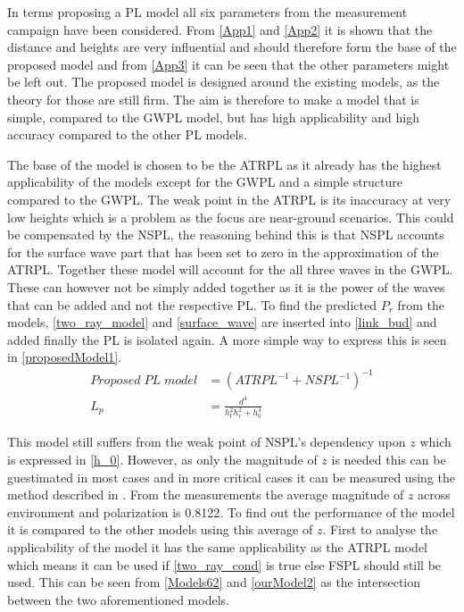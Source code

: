 

In terms proposing a PL model all six parameters from the measurement campaign have been considered. From \autoref{App1} and \autoref{App2} it is shown that the distance and heights are very influential and should therefore form the base of the proposed model and from \autoref{App3} it can be seen that the other parameters might be left out. %
The proposed model is designed around the existing models, as the theory for those are still firm. The aim is therefore to make a model that is simple, compared to the GWPL model, but has high applicability and high accuracy compared to the other PL models. 


The base of the model is chosen to be the ATRPL as it already has the highest applicability of the models except for the GWPL and a simple structure compared to the GWPL. The weak point in the ATRPL is its inaccuracy at very low heights which is a problem as the focus are near-ground scenarios. This could be compensated by the NSPL, the reasoning behind this is that NSPL accounts for the surface wave part that has been set to zero in the approximation of the ATRPL. Together these model will account for the all three waves in the GWPL. These can however not be simply added together as it is the power of the waves that can be added and not the respective PL. To find the predicted $P_r$ from the models, \eqref{two_ray_model} and \eqref{surface_wave} are inserted into \eqref{link_bud} and added finally the PL is isolated again. A more simple way to express this is seen in \eqref{proposedModel1}.
\begin{align}
Proposed\; PL\; model &= \left(ATRPL^{-1} + NSPL^{-1}\right)^{-1} \label{proposedModel1}\\
L_p &= \frac{d^4}{h_t^2 h_r^2+h_0^4} \label{proposedModel2}
\end{align}

This model still suffers from the weak point of NSPL's dependency upon $z$ which is expressed in \eqref{h_0}. However, as only the magnitude of $z$ is needed this can be guestimated in most cases and in more critical cases it can be measured using the method described in \cite{Kim}. From the measurements the average magnitude of $z$ across environment and polarization is 0.8122. To find out the performance of the model it is compared to the other models using this average of $z$. First to analyse the applicability of the model it has the same applicability as the ATRPL model which means it can be used if \eqref{two_ray_cond} is true else FSPL should still be used. This can be seen from \autoref{Models62} and \autoref{ourModel2} as the intersection between the two aforementioned models.




